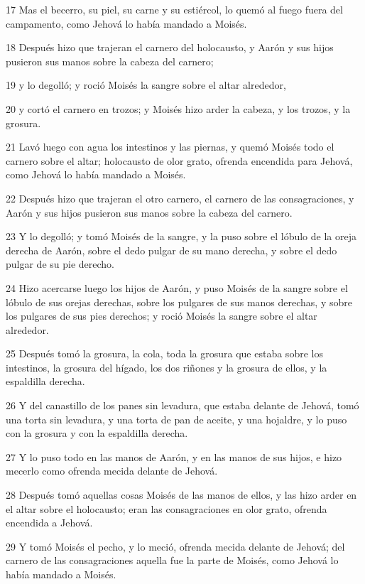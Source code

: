 \par 17 Mas el becerro, su piel, su carne y su estiércol, lo quemó al fuego fuera del campamento, como Jehová lo había mandado a Moisés.
\par 18 Después hizo que trajeran el carnero del holocausto, y Aarón y sus hijos pusieron sus manos sobre la cabeza del carnero;
\par 19 y lo degolló; y roció Moisés la sangre sobre el altar alrededor,
\par 20 y cortó el carnero en trozos; y Moisés hizo arder la cabeza, y los trozos, y la grosura.
\par 21 Lavó luego con agua los intestinos y las piernas, y quemó Moisés todo el carnero sobre el altar; holocausto de olor grato, ofrenda encendida para Jehová, como Jehová lo había mandado a Moisés.
\par 22 Después hizo que trajeran el otro carnero, el carnero de las consagraciones, y Aarón y sus hijos pusieron sus manos sobre la cabeza del carnero.
\par 23 Y lo degolló; y tomó Moisés de la sangre, y la puso sobre el lóbulo de la oreja derecha de Aarón, sobre el dedo pulgar de su mano derecha, y sobre el dedo pulgar de su pie derecho.
\par 24 Hizo acercarse luego los hijos de Aarón, y puso Moisés de la sangre sobre el lóbulo de sus orejas derechas, sobre los pulgares de sus manos derechas, y sobre los pulgares de sus pies derechos; y roció Moisés la sangre sobre el altar alrededor.
\par 25 Después tomó la grosura, la cola, toda la grosura que estaba sobre los intestinos, la grosura del hígado, los dos riñones y la grosura de ellos, y la espaldilla derecha.
\par 26 Y del canastillo de los panes sin levadura, que estaba delante de Jehová, tomó una torta sin levadura, y una torta de pan de aceite, y una hojaldre, y lo puso con la grosura y con la espaldilla derecha.
\par 27 Y lo puso todo en las manos de Aarón, y en las manos de sus hijos, e hizo mecerlo como ofrenda mecida delante de Jehová.
\par 28 Después tomó aquellas cosas Moisés de las manos de ellos, y las hizo arder en el altar sobre el holocausto; eran las consagraciones en olor grato, ofrenda encendida a Jehová.
\par 29 Y tomó Moisés el pecho, y lo meció, ofrenda mecida delante de Jehová; del carnero de las consagraciones aquella fue la parte de Moisés, como Jehová lo había mandado a Moisés.
